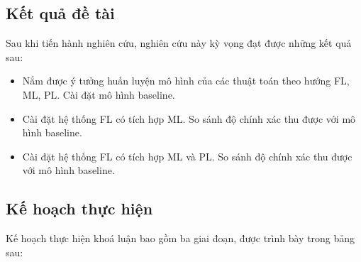 \documentclass{article}[14pt]
\begin{document}
{    \subsection*{Kết quả đề tài}

    Sau khi tiến hành nghiên cứu, nghiên cứu này kỳ vọng đạt được những kết quả sau:

    \begin{itemize}
        \item Nắm được ý tưởng huấn luyện mô hình của các thuật toán theo hướng FL, ML, PL. Cài đặt mô hình baseline.
        \item Cài đặt hệ thống FL có tích hợp ML. So sánh độ chính xác thu được với mô hình baseline.
        \item Cài đặt hệ thống FL có tích hợp ML và PL. So sánh độ chính xác thu được với mô hình baseline.
    \end{itemize}

    \subsection*{Kế hoạch thực hiện}

    Kế hoạch thực hiện khoá luận bao gồm ba giai đoạn, được trình bày trong bảng sau:

}
\end{document}
